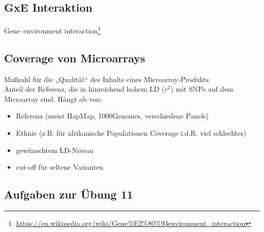 \subsection{GxE Interaktion}
Gene–environment interaction\footnote{\url{https://en.wikipedia.org/wiki/Gene\%E2\%80\%93environment_interaction}}

\subsection{Coverage von Microarrays}
Maßzahl für die „Qualität“ des Inhalts eines Microarray-Produkts\\
Anteil der Referenz, die in hinreichend hohem LD ($r^2$) mit SNPs auf dem Microarray sind. Hängt ab von:
\begin{itemize}
	\item Referenz (meist HapMap, 1000Genomes, verschiedene Panels)
	\item Ethnie (z.B. für afrikanische Populationen Coverage i.d.R. viel schlechter)
	\item gewünschtem LD-Niveau
	\item cut-off für seltene Varianten
\end{itemize}

\subsection{Aufgaben zur Übung 11}